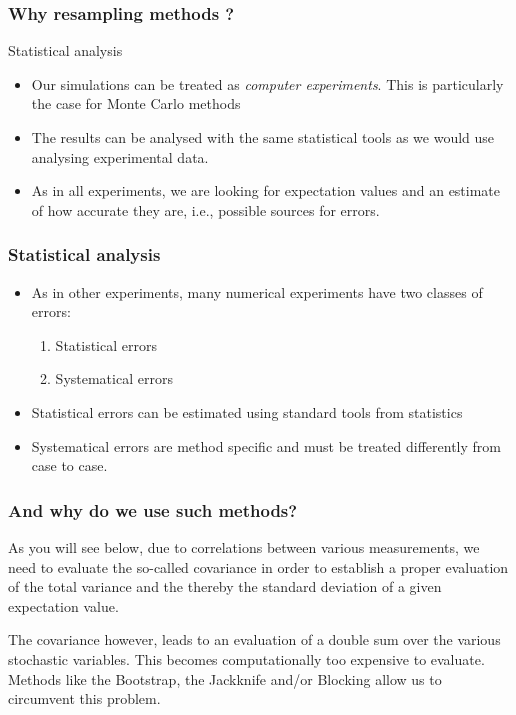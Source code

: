 \documentclass{beamer}
\begin{document}
\begin{frame}
\frametitle{Why resampling methods ?}

\begin{block}{Statistical analysis }
\begin{itemize}
\item Our simulations can be treated as \emph{computer experiments}. This is particularly the case for Monte Carlo methods

\item The results can be analysed with the same statistical tools as we would use analysing experimental data.

\item As in all experiments, we are looking for expectation values and an estimate of how accurate they are, i.e., possible sources for errors.
\end{itemize}

\noindent
\end{block}
\end{frame}

\begin{frame}
\frametitle{Statistical analysis}

\begin{block}{}
\begin{itemize}
\item As in other experiments, many numerical  experiments have two classes of errors:
\begin{enumerate}

\item Statistical errors

\item Systematical errors

\end{enumerate}

\noindent
\item Statistical errors can be estimated using standard tools from statistics

\item Systematical errors are method specific and must be treated differently from case to case. 
\end{itemize}

\noindent
\end{block}
\end{frame}

\begin{frame}
\frametitle{And why do we use such methods?}

As you will see below, due to correlations between various
measurements, we need to evaluate the so-called covariance in order to
establish a proper evaluation of the total variance and the thereby
the standard deviation of a given expectation value.

The covariance however, leads to an evaluation of a double sum over the various stochastic variables. This becomes computationally too expensive to evaluate.
Methods like the Bootstrap, the Jackknife and/or Blocking allow us to circumvent this problem.
\end{frame}
\end{document}
